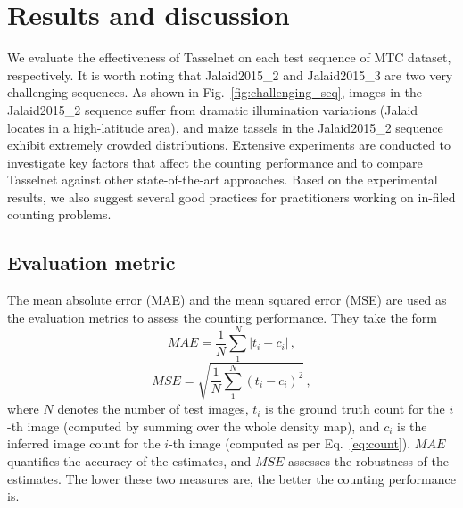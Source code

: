 \documentclass[twocolumn]{bmcart}%
\begin{document}
\section*{Results and discussion}
%
We evaluate the effectiveness of Tasselnet on each test sequence of MTC dataset, respectively. It is worth noting that Jalaid2015\_2 and Jalaid2015\_3 are two very challenging sequences. As shown in Fig.~\ref{fig:challenging_seq}, images in the Jalaid2015\_2 sequence suffer from dramatic illumination variations (Jalaid locates in a high-latitude area), and maize tassels in the Jalaid2015\_2 sequence exhibit extremely crowded distributions. Extensive experiments are conducted to investigate key factors that affect the counting performance and to compare Tasselnet against other state-of-the-art approaches. Based on the experimental results, we also suggest several good practices for practitioners working on in-filed counting problems.

\subsection*{Evaluation metric}
%
The mean absolute error (MAE) and the mean squared error (MSE) are used as the evaluation metrics to assess the counting performance. They take the form
\begin{equation}
MAE=\frac{1}{N}\sum_1^N|t_i-c_i|\,,
\end{equation}
\begin{equation}
MSE=\sqrt{\frac{1}{N}\sum_1^N(t_i-c_i)^2}\,,
\end{equation}
where $N$ denotes the number of test images, $t_i$ is the ground truth count for the $i$-th image (computed by summing over the whole density map), and $c_i$ is the inferred image count for the $i$-th image (computed as per Eq.~\eqref{eq:count}). $MAE$ quantifies the accuracy of the estimates, and $MSE$ assesses the robustness of the estimates. The lower these two measures are, the better the counting performance is.
\end{document}

